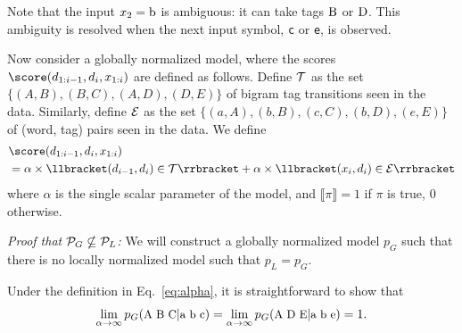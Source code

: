 Note that the input $x_2 = \hbox{b}$ is ambiguous: it can take tags
$\hbox{B}$ or $\hbox{D}$. This ambiguity is resolved when the next
input symbol, {\tt c} or {\tt e}, is observed.

Now consider a globally normalized model, where the scores
$\score(d_{1:i-1}, d_i, x_{1:i})$ are defined as follows. 
Define ${\cal T}$ as the set $\{ (A, B), (B, C), (A, D), (D, E)\}$
of bigram tag transitions seen in the data. Similarly, define ${\cal
  E}$ as the set $\{ (a, A), (b, B), (c, C), (b, D), (e, E)\}$ of
(word, tag) pairs seen in the data. We define 
\begin{align}
&\score(d_{1:i-1}, d_i, x_{1:i})
\label{eq:alpha} \\
&=\alpha \times \llbracket(d_{i-1}, d_i) \in {\cal T} \rrbracket
+ \alpha \times \llbracket (x_i, d_i) \in {\cal E} \rrbracket
\nonumber
\end{align}
where $\alpha$ is the single scalar parameter of the model,
and $\llbracket \pi \rrbracket = 1$ if $\pi$ is true, $0$ otherwise.


{\em Proof that ${\cal P}_G \nsubseteq {\cal P}_L$:} We
will construct a globally normalized model $p_G$ such that there is
no locally normalized model such that $p_L = p_G$.

Under the definition in Eq.~\eqref{eq:alpha},
it is straightforward to show that
\begin{align*}\small
\lim_{\alpha \rightarrow \infty} p_G(\hbox{A B C} | \hbox{a b c}) =
\lim_{\alpha \rightarrow \infty} p_G(\hbox{A D E} | \hbox{a b e}) = 1 .
\end{align*}

